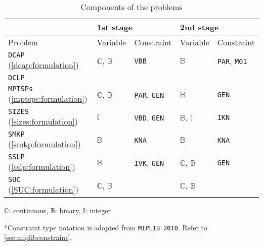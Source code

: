 \begin{table}[H]
	\centering
	\caption{Components of the problems}
	\label{table:prob_class}
	\begin{threeparttable}
		\begin{tabular}{@{}lllll@{}}
			\toprule
			& \multicolumn{2}{l}{1st stage}                              				  	& \multicolumn{2}{l}{2nd stage}                             			        \\ \midrule
			Problem 	     & Variable                    & Constraint                   	& Variable                    & Constraint                  				    \\ \midrule
			\texttt{DCAP} (\ref{dcap:formulation})    & $\mathbb{C}$, $\mathbb{B}$  & \texttt{VBB}                	& $\mathbb{B}$                & \texttt{PAR}, \texttt{M01} 			    		\\
			\texttt{DCLP}  	 &							   &								& 			 	  &													\\				
			\texttt{MPTSPs} (\ref{mptsps:formulation})  & $\mathbb{C}$, $\mathbb{B}$  & \texttt{PAR}, \texttt{GEN}		& $\mathbb{B}$                & \texttt{GEN}               						\\
			\texttt{SIZES} (\ref{sizes:formulation})   & $\mathbb{I}$ 			   & \texttt{VBD}, \texttt{GEN} 	& $\mathbb{B}$, $\mathbb{I}$  & \texttt{IKN}             						\\
			\texttt{SMKP} (\ref{smkp:formulation})   & $\mathbb{B}$                & \texttt{KNA}                	& $\mathbb{B}$                & \texttt{KNA}              						\\
			\texttt{SSLP} (\ref{sslp:formulation})   & $\mathbb{B}$                & \texttt{IVK}, \texttt{GEN} 	& $\mathbb{C}$, $\mathbb{B}$  & \texttt{GEN}             						\\
			\texttt{SUC} (\ref{SUC:formulation})   & $\mathbb{C}$, $\mathbb{B}$                 &                              	& $\mathbb{C}$, $\mathbb{B}$  &                             					\\ \bottomrule
		\end{tabular}
		
		\begin{tablenotes}
			\small
			\item *$\mathbb{C}$: continuous, $\mathbb{B}$: binary, $\mathbb{I}$: integer
			\item **Constraint type notation is adopted from \texttt{MIPLIB 2010}. Refer to \ref{sec:miplibconstraint}.
		\end{tablenotes}
	\end{threeparttable}
\end{table}